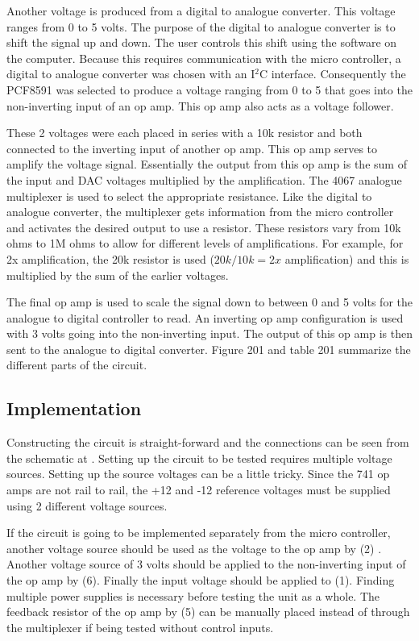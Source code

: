 Another voltage is produced from a digital to analogue converter. This voltage
 ranges from 0 to 5 volts. The purpose of the digital to analogue converter is
 to shift the signal up and down. The user controls this shift using the
 software on the computer. Because this requires communication with the micro
 controller, a digital to analogue converter was chosen with an 
I$^2$C interface. Consequently the PCF8591 was selected to 
produce a voltage ranging from 0 to 5 that goes into the non-inverting input 
of an op amp. This op amp also acts as a voltage follower.

These 2 voltages were each placed in series with a 10k resistor and both 
connected to the inverting input of another op amp. This op amp serves to 
amplify the voltage signal. Essentially the output from this op amp is the sum
 of the input and DAC voltages multiplied by the amplification\cite{bk:olia}. The 4067
 analogue multiplexer is used to select the appropriate resistance. Like the 
digital to analogue converter, the multiplexer gets information from the micro
 controller and activates the desired output to use a resistor. These
 resistors vary from 10k ohms to 1M ohms to allow for different levels of 
amplifications. For example, for 2x amplification, the 20k resistor is used 
($20k/10k = 2x$ amplification) and this is multiplied by the sum of the 
earlier voltages\cite{bk:olia}.

The final op amp is used to scale the signal down to between 0 and 5 volts for 
the analogue to digital controller to read. An inverting op amp configuration 
is used with 3 volts going into the non-inverting input.
The output of this op amp is then sent to the analogue to digital converter.
Figure 201 and table 201 summarize the different parts of the circuit.

\subsection{Implementation}
Constructing the circuit is straight-forward and the connections can be seen 
from the schematic at \pageref{sch:signal amp}. Setting up the circuit to be tested requires 
multiple voltage sources. Setting up the source voltages can be a little tricky.
Since the 741 op amps are not rail to rail, the +12 and -12 reference voltages 
must be supplied using 2 different voltage sources. 

If the circuit is going to be implemented separately from the micro controller, another voltage source should be used as the voltage to the op amp by (2) 
. Another voltage source of 3 volts should be applied to the non-inverting 
input of the op amp by (6). Finally the input voltage should be applied to 
(1). Finding multiple power supplies is necessary before testing the unit as a 
whole.  The feedback resistor of the op amp by (5) can be manually placed
 instead of through the multiplexer if being tested without control inputs. 

